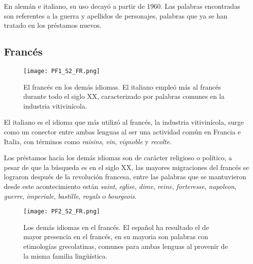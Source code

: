 En alemán e italiano, su uso decayó a partir de 1960. Las palabras encontradas son referentes a la guerra y apellidos de personajes, palabras que ya se han tratado en los préstamos nuevos.




 





\subsection{Francés} %

\begin{figure}%
	\centering
	\texttt{[image: PF1\_S2\_FR.png]}
	\label{fig.ST_a_FR}
	\caption{El francés en los demás idiomas. El italiano empleó más al francés durante todo el siglo XX, caracterizado por palabras comunes en la industria vitivinícola.}
\end{figure}


El italiano es el idioma que más utilizó al francés,  la industria vitivinícola, surge como un conector entre ambas lenguas al ser una actividad común en Francia e Italia, con términos como \textit{raisins}, \textit{vin}, \textit{vignoble} y \textit{recolte}.

Los préstamos hacia los demás idiomas son de carácter religioso o político, a pesar de que la búsqueda es en el siglo XX, las mayores migraciones del francés se lograron después de la revolución francesa, entre las palabras que se mantuvieron desde este acontecimiento están  \textit{saint}, \textit{eglise}, \textit{dime}, \textit{reine}, \textit{forteresse}, \textit{napoleon}, \textit{guerre}, \textit{imperiale}, \textit{bastille}, \textit{royals} o \textit{bourgeois}.  


\begin{figure}%
	\centering
	\texttt{[image: PF2\_S2\_FR.png]}
	\label{fig.ST_b_FR}
	\caption{Los demás idiomas en el francés. El español ha resultado el de mayor presencia en el francés, en su mayoria son palabras con etimologías grecolatinas, comunes para ambas lenguas al provenir de la misma familia lingüística.}
\end{figure}
		
